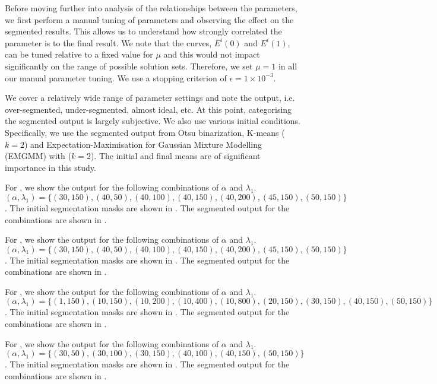 \begin{definition} Before moving further into analysis of the relationships between the parameters, we first perform a manual tuning of parameters and observing the effect on the segmented results. This allows us to understand how strongly correlated the parameter is to the final result. We note that the curves, $E^i(0)$ and $E^i(1)$, can be tuned relative to a fixed value for $\mu$ and this would not impact significantly on the range of possible solution sets. Therefore, we set $\mu=1$ in all our manual parameter tuning. We use a stopping criterion of $\epsilon=1\times10^{-3}$.
	
We cover a relatively wide range of parameter settings and note the output, i.e. over-segmented, under-segmented, almost ideal, etc. At this point, categorising the segmented output is largely subjective. We also use various initial conditions. Specifically, we use the segmented output from Otsu binarization, K-means ($k=2$) and Expectation-Maximisation for Gaussian Mixture Modelling (EMGMM) with ($k=2$). The initial and final means are of significant importance in this study.

For , we show the output for the following combinations of $\alpha$ and $\lambda_1$. $(\alpha,\lambda_1) = \{(30,150), (40,50), (40,100), (40,150), (40,200), (45,150), (50,150)\}$. The initial segmentation masks are shown in . The segmented output for the combinations are shown in .

For , we show the output for the following combinations of $\alpha$ and $\lambda_1$. $(\alpha,\lambda_1) = \{(30,150), (40,50), (40,100), (40,150), (40,200), (45,150), (50,150)\}$. The initial segmentation masks are shown in . The segmented output for the combinations are shown in .

For , we show the output for the following combinations of $\alpha$ and $\lambda_1$. $(\alpha,\lambda_1) = \{(1,150), (10,150), (10,200), (10,400), (10,800), (20,150), (30,150), (40,150), (50,150)\}$. The initial segmentation masks are shown in . The segmented output for the combinations are shown in .

For , we show the output for the following combinations of $\alpha$ and $\lambda_1$. $(\alpha,\lambda_1) = \{(30,50), (30,100), (30,150), (40,100), (40,150), (50,150)\}$. The initial segmentation masks are shown in . The segmented output for the combinations are shown in .


\end{definition}
